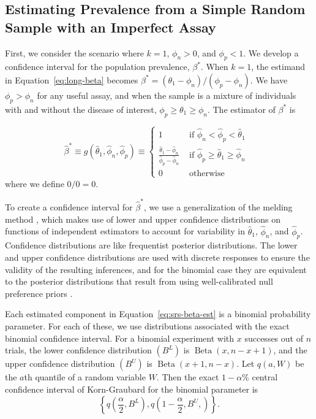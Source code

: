 \documentclass[AMA,STIX1COL]{WileyNJD-v2}
\begin{document}
\subsection{Estimating Prevalence from a Simple Random Sample with an Imperfect Assay}
\label{sec:srs-imperfect}

First, we consider the scenario where \( k = 1 \), \( \phi_n > 0 \), and \( \phi_p < 1 \).
We develop a confidence interval for the population prevalence, \( \beta^* \).
When \( k = 1 \), the estimand in Equation~\ref{eq:long-beta} becomes $\beta^* = (\theta_1 - \phi_n)/(\phi_p-\phi_n)$. We have $\phi_p > \phi_n$ for any useful assay, and when the sample is a mixture of individuals with and without the disease of interest, $\phi_p \geq \theta_1 \geq \phi_n$. The estimator of $\beta^*$ is 

\begin{equation}
\hat{\beta}^* \equiv 
g(\hat{\theta}_1, \hat{\phi}_n, \hat{\phi}_p)
\equiv 
\left\{ 
\begin{array}{ll}
1 & \mbox{ if $\hat{\phi}_n < \hat{\phi}_p < \hat{\theta}_1$ }  \\
\frac{\hat{\theta}_1 - \hat{\phi}_n}{\hat{\phi}_p - \hat{\phi}_n} & 
\mbox{ if $\hat{\phi}_p \geq \hat{\theta}_1 \geq \hat{\phi}_n$ } \\
0 & \mbox{ otherwise} 
\end{array}
\right.
\label{eq:srs-beta-est}
\end{equation}
where we define $0/0=0$.



To create a confidence interval for \( \hat{\beta}^* \), we use a generalization of the melding method \cite{FayP:2015}, which makes use of lower and upper confidence distributions on functions of independent estimators to account for variability in \( \hat{\theta}_1 \), \( \hat{\phi}_n \), and \( \hat{\phi}_p \). Confidence distributions are like frequentist posterior distributions\cite{Xie2013}.
The lower and upper confidence distributions are used with discrete responses to ensure the validity of the resulting inferences, and for the binomial case they are equivalent to the posterior distributions that result from using well-calibrated null preference priors \cite{Fay2021}.

Each estimated component in Equation~\ref{eq:srs-beta-est} is a binomial probability parameter.
For each of these, we use distributions associated with  the exact binomial confidence interval.
For a binomial experiment with \( x \) successes out of \( n \) trials, the lower confidence distribution \( (B^L) \) is \( \operatorname{Beta}(x, n - x + 1) \), and the upper confidence distribution \( (B^U) \) is \( \operatorname{Beta}(x + 1, n - x)\).
Let \( q(a, W) \) be the \( a \)th quantile of a random variable \( W \). Then the exact \( 1 - \alpha \)\% central confidence interval of Korn-Graubard for the binomial parameter is 
\begin{equation}
\left\{ q \left( \frac{\alpha}{2}, B^L \right), q \left( 1 - \frac{\alpha}{2}, B^U, \right) \right\}.
\label{eq:C-P}
\end{equation}
\end{document}
